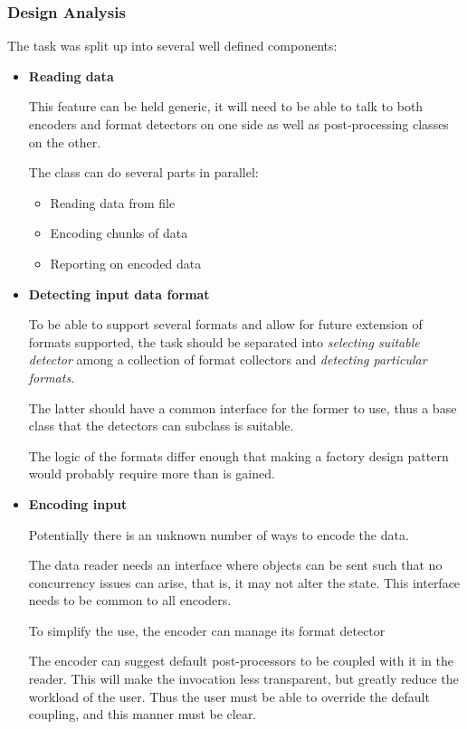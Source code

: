 \documentclass[letterpaper,10pt,english]{sphinxmanual}
\begin{document}
\subsubsection{Design Analysis}
\label{c3se_python_course:design-analysis}
The task was split up into several well defined components:
\begin{itemize}
\item {} 
\textbf{Reading data}

This feature can be held generic, it will need to be able to talk to
both encoders and format detectors on one side as well as post-processing
classes on the other.

The class can do several parts in parallel:
\begin{itemize}
\item {} 
Reading data from file

\item {} 
Encoding chunks of data

\item {} 
Reporting on encoded data

\end{itemize}

\item {} 
\textbf{Detecting input data format}

To be able to support several formats and allow for future extension of
formats supported, the task should be separated into \emph{selecting suitable
detector} among a collection of format collectors and \emph{detecting particular
formats}.

The latter should have a common interface for the former to use, thus a
base class that the detectors can subclass is suitable.

The logic of the formats differ enough that making a factory design pattern
would probably require more than is gained.

\item {} 
\textbf{Encoding input}

Potentially there is an unknown number of ways to encode the data.

The data reader needs an interface where objects can be sent such that
no concurrency issues can arise, that is, it may not alter the state.
This interface needs to be common to all encoders.

To simplify the use, the encoder can manage its format detector

The encoder can suggest default post-processors to be coupled with it in
the reader.
This will make the invocation less transparent, but greatly reduce the
workload of the user.
Thus the user must be able to override the default coupling, and this
manner must be clear.


\end{itemize}
\end{document}
